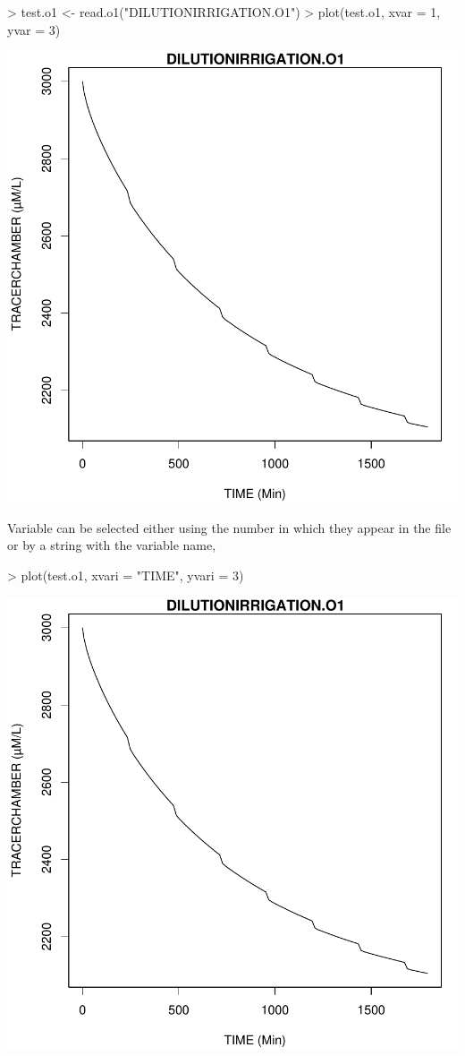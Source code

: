 \documentclass{scrartcl}
\begin{document}
\begin{Schunk}
\begin{Sinput}
> test.o1 <- read.o1("DILUTIONIRRIGATION.O1")
> plot(test.o1, xvar = 1, yvar = 3)
\end{Sinput}
\end{Schunk}
\includegraphics{figures/f-005}

Variable can be selected either using the number in which they appear
in the file or by a string with the variable name,

\begin{Schunk}
\begin{Sinput}
> plot(test.o1, xvari = "TIME", yvari = 3)
\end{Sinput}
\end{Schunk}
\includegraphics{figures/f-006}
\end{document}
